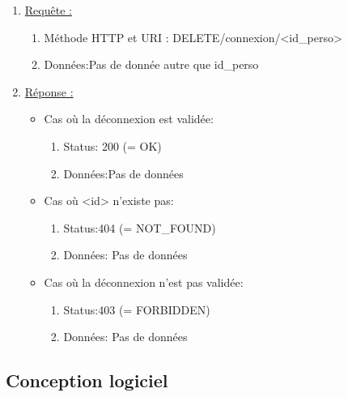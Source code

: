 \documentclass[11pt, a4paper]{article}
\begin{document}
  \begin{enumerate}
   \item \underline{Requête :}
    \begin{enumerate}
     \item Méthode HTTP et URI : DELETE/connexion/<id\_perso>
     \item Données:Pas de donnée autre que id\_perso
		     
    \end{enumerate}

   \item \underline{Réponse :}
   \begin{itemize}
    \item Cas où la déconnexion est validée:
    \begin{enumerate}
     \item Status: 200 (= OK)
     \item Données:Pas de données\\	 
    \end{enumerate}
    \item Cas où <id> n'existe pas:
    \begin{enumerate}
     \item Status:404 (= NOT\_FOUND)
     \item Données: Pas de données\\
    \end{enumerate}    
    \item Cas où la déconnexion n'est pas validée:
    \begin{enumerate}
     \item Status:403 (= FORBIDDEN)
     \item Données: Pas de données\\
    \end{enumerate}
    
   \end{itemize}

  \end{enumerate}
  


  


  \subsection{Conception logiciel}
\end{document}

